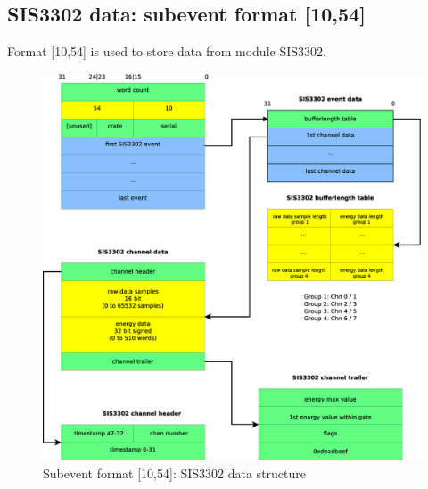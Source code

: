 \documentclass[10pt,a4paper]{article}
\begin{document}
\subsection{SIS3302 data: subevent format [10,54]}
Format [10,54] is used to store data from module SIS3302.
\begin{figure}[H]
\centerline{\includegraphics[width=\linewidth]{MedSevt_SIS3302}}
\caption{Subevent format [10,54]: SIS3302 data structure}
\label{MedSevt_SIS3302}
\end{figure}
\newpage
\end{document}
